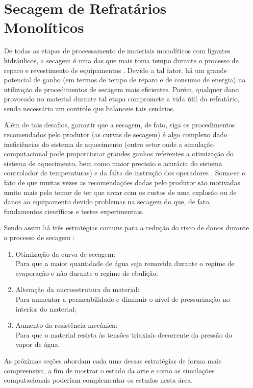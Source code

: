 \section{Secagem de Refratários Monolíticos}\label{secagem}
De todas as etapas de processamento de materiais monolíticos com ligantes
hidráulicos, a secagem é uma das que mais toma tempo durante o processo de
reparo e revestimento de equipamentos \cite{da2015refractory}. Devido a tal
fator, há um grande potencial de ganho (em termos de tempo de reparo e de
consumo de energia) na utilização de procedimentos de secagem mais eficientes.
Porém, qualquer dano provocado no material durante tal etapa compromete a vida
útil do refratário, sendo necessário um controle que balanceie tais cenários.

Além de tais desafios, garantir que a secagem, de fato, siga os procedimentos
recomendados pelo produtor (as curvas de secagem) é algo complexo dado
ineficiências do sistema de aquecimento (outro setor onde a simulação
computacional pode proporcionar grandes ganhos referentes a otimização do
sistema de aquecimento, bem como maior precisão e acurácia do sistema
controlador de temperaturas) e da falta de instrução dos operadores
\cite{da2015refractory}. Soma-se o fato de que muitas vezes as recomendações
dadas pelo produtor são motivadas muito mais pelo temor de ter que arcar com os
custos de uma explosão ou de danos ao equipamento devido problemas na secagem do
que, de fato, fundamentos científicos e testes experimentais.

Sendo assim há três estratégias comuns para a redução do risco de danos durante
o processo de secagem \cite{da2015refractory}:

\begin{enumerate}
\item Otimização da curva de secagem: \\ Para que a maior quantidade de água
  seja removida durante o regime de evaporação e não durante o regime de ebulição;
\item Alteração da microestrutura do material: \\ Para aumentar a permeabilidade e
  diminuir o nível de pressurização no interior do material;
\item Aumento da resistência mecânica: \\ Para que o material resista às tensões
  triaxiais decorrente da pressão do vapor de água.
\end{enumerate}

As próximas seções abordam cada uma dessas estratégias de forma mais
compreensiva, a fim de mostrar o estado da arte e como as simulações
computacionais poderiam complementar os estudos nesta área.

